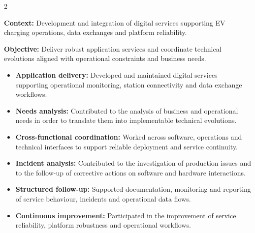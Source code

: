 \documentclass[8pt,a4paper,ragged2e,withhyper]{altacv}
\begin{document}


\makecvheader

\vspace{-0.3cm}


\begin{paracol}{2}



\textbf{Context:} Development and integration of digital services supporting EV charging operations, data exchanges and platform reliability.

\textbf{Objective:} Deliver robust application services and coordinate technical evolutions aligned with operational constraints and business needs.

\begin{itemize}
\item \textbf{Application delivery:} Developed and maintained digital services supporting operational monitoring, station connectivity and data exchange workflows.
\item \textbf{Needs analysis:} Contributed to the analysis of business and operational needs in order to translate them into implementable technical evolutions.
\item \textbf{Cross-functional coordination:} Worked across software, operations and technical interfaces to support reliable deployment and service continuity.
\item \textbf{Incident analysis:} Contributed to the investigation of production issues and to the follow-up of corrective actions on software and hardware interactions.
\item \textbf{Structured follow-up:} Supported documentation, monitoring and reporting of service behaviour, incidents and operational data flows.
\item \textbf{Continuous improvement:} Participated in the improvement of service reliability, platform robustness and operational workflows.
\end{itemize}


\end{paracol}
\end{document}
